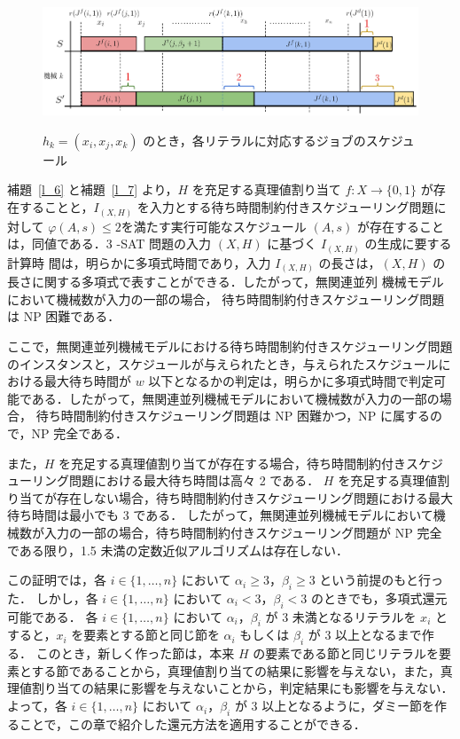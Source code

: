 \documentclass[12pt]{optlab-bachelor}
\begin{document}
\begin{figure}[h]
  \centering
  \includegraphics[width = 16cm]{figure/3SAT2.pdf}\\
  \caption{$h_k = (x_i, x_j, x_k)$ のとき，各リテラルに対応するジョブのスケジュール}
  \label{4.2}
\end{figure}

補題~\ref{l_6} と補題~\ref{l_7} より，$H$ を充足する真理値割り当て $f : X \to \{0,
1\}$ が存在することと，$I_{(X,H)}$ を入力とする待ち時間制約付きスケジューリング問題に対して $\varphi(A,s) \le 2$を満たす実行可能なスケジュール $(A,s)$ が存在することは，同値である．3 -SAT 問題の入力 $(X,H)$ に基づく $I_{(X,H)}$ の生成に要する計算時
間は，明らかに多項式時間であり，入力 $I_{(X,H)}$ の長さは，$(X, H)$
の長さに関する多項式で表すことができる．したがって，無関連並列
機械モデルにおいて機械数が入力の一部の場合， 待ち時間制約付きスケジューリング問題は NP 困難である．

ここで，無関連並列機械モデルにおける待ち時間制約付きスケジューリング問題のインスタンスと，スケジュールが与えられたとき，与えられたスケジュールにおける最大待ち時間が $w$ 以下となるかの判定は，明らかに多項式時間で判定可能である．したがって，無関連並列機械モデルにおいて機械数が入力の一部の場合， 待ち時間制約付きスケジューリング問題は NP 困難かつ，NP に属するので，NP 完全である．

また，$H$ を充足する真理値割り当てが存在する場合，待ち時間制約付きスケジューリング問題における最大待ち時間は高々 2 である．
$H$ を充足する真理値割り当てが存在しない場合，待ち時間制約付きスケジューリング問題における最大待ち時間は最小でも 3 である．
したがって，無関連並列機械モデルにおいて機械数が入力の一部の場合，待ち時間制約付きスケジューリング問題が NP 完全である限り，1.5 未満の定数近似アルゴリズムは存在しない．

この証明では，各 $i \in \{1,\ldots,n\}$ において $\alpha_i \ge 3$，$\beta_i \ge 3$ という前提のもと行った．
しかし，各 $i \in \{1,\ldots,n\}$ において $\alpha_i < 3$，$\beta_i < 3$ のときでも，多項式還元可能である．
各 $i \in \{1,\ldots,n\}$ において $\alpha_i$，$\beta_i$ が 3 未満となるリテラルを $x_i$ とすると，$x_i$ を要素とする節と同じ節を $\alpha_i$ もしくは $\beta_i$ が 3 以上となるまで作る．
このとき，新しく作った節は，本来 $H$ の要素である節と同じリテラルを要素とする節であることから，真理値割り当ての結果に影響を与えない，また，真理値割り当ての結果に影響を与えないことから，判定結果にも影響を与えない．
よって，各 $i \in \{1,\ldots,n\}$ において $\alpha_i$，$\beta_i$ が 3 以上となるように，ダミー節を作ることで，この章で紹介した還元方法を適用することができる．
\end{document}
